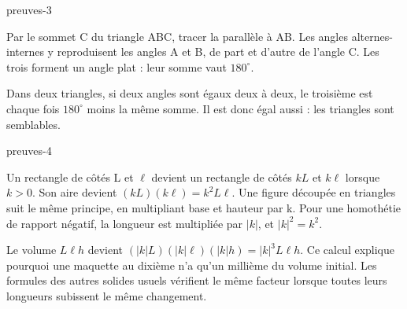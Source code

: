 \begin{blocEdition}{preuves-3}

\begin{demonstration}
Par le sommet C du triangle ABC, tracer la parallèle à AB.
Les angles alternes-internes y reproduisent les angles A et B,
de part et d’autre de l’angle C. Les trois forment un angle plat :
leur somme vaut $180^\circ$.
\end{demonstration}
\begin{center}\end{center}
\begin{demonstration}
Dans deux triangles, si deux angles sont égaux deux à deux,
le troisième est chaque fois $180^\circ$ moins la même somme.
Il est donc égal aussi : les triangles sont semblables.
\end{demonstration}

\end{blocEdition}
\begin{blocEdition}{preuves-4}

\begin{demonstration}
Un rectangle de côtés L et $\ell$ devient un rectangle de côtés
$kL$ et $k\ell$ lorsque $k>0$. Son aire devient
$(kL)(k\ell)=k^2L\ell$. Une figure découpée en triangles suit le même
principe, en multipliant base et hauteur par k. Pour une homothétie
de rapport négatif, la longueur est multipliée par $|k|$, et
$|k|^2=k^2$.
\end{demonstration}
\begin{demonstration}
Le volume $L\ell h$ devient $(|k|L)(|k|\ell)(|k|h)=|k|^3L\ell h$.
Ce calcul explique pourquoi une maquette au dixième n’a qu’un millième
du volume initial. Les formules des autres solides usuels vérifient
le même facteur lorsque toutes leurs longueurs subissent le même changement.
\end{demonstration}

\end{blocEdition}
